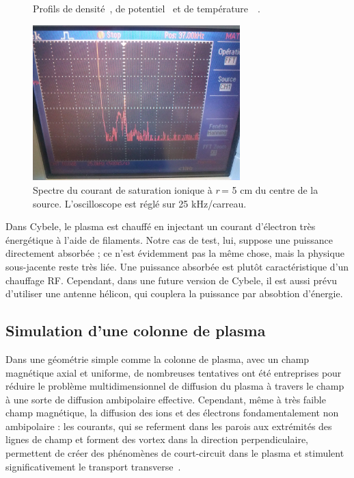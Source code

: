 \begin{refsection}
\begin{figure}[!htbp]
    \caption{Profils de densité~, de
    potentiel~ et de
    température~~\parencite{SimoninHDR}.}
    \label{4-CybeleExp}
\end{figure}
\begin{figure}[!htbp]
  \centering
    \includegraphics[height=6cm]{figures/4-CybeleFourierSignal.jpg}
    \caption{Spectre du courant de saturation
    ionique à $r\,$= 5 cm du centre de la source.
    L'oscilloscope est réglé sur 25 kHz/carreau.\label{4-CybeleFourierSignal}}
\end{figure}

Dans Cybele, le plasma est chauffé en injectant un courant
d'électron très énergétique à l'aide de filaments. Notre cas de
test, lui, suppose une puissance directement absorbée ; ce n'est évidemment pas
la même chose, mais la physique sous-jacente reste très liée. Une puissance
absorbée est plutôt caractéristique d'un chauffage RF. Cependant, dans une future version de Cybele, il est aussi
prévu d'utiliser une antenne hélicon, qui couplera la puissance par absobtion d'énergie.
 
\subsection{Simulation d'une colonne de plasma}

Dans une géométrie simple comme la colonne de plasma, avec un champ magnétique
axial et uniforme, de nombreuses tentatives ont été entreprises pour réduire le
problème multidimensionnel de diffusion du plasma à travers le champ à une
sorte de diffusion ambipolaire effective. Cependant, même à très faible champ
magnétique, la diffusion des ions et des électrons fondamentalement non
ambipolaire : les courants, qui se referment dans les parois aux extrémités des
lignes de champ et forment des vortex dans la direction perpendiculaire,
permettent de créer des phénomènes de court-circuit dans le plasma et stimulent
significativement le transport transverse~\parencite{Gurevich}.


\end{refsection}
